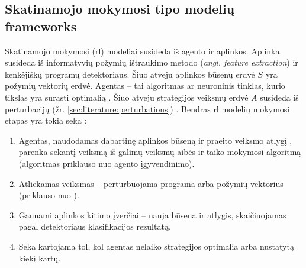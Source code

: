 \subsection{Skatinamojo mokymosi tipo modelių \glspl{framework}}\label{sec:literature:rl}

Skatinamojo mokymosi (\gls{rl}) modeliai susideda iš agento ir aplinkos.
Aplinka susideda iš informatyvių požymių ištraukimo metodo (\textit{angl.
    feature extraction}) ir kenkėjiškų programų detektoriaus. Šiuo atveju aplinkos
būsenų erdvė $S$ yra požymių vektorių erdvė. Agentas -- tai algoritmas ar
neuroninis tinklas, kurio tikslas yra surasti optimalią . Šiuo atveju strategijos veiksmų erdvė $A$ susideda iš
perturbacijų (žr. \ref{sec:literature:perturbations})
\cite{fangEvadingMalwareEngines2019}. Bendras \gls{rl} modelių mokymosi etapas
yra tokia seka \cite{fangEvadingMalwareEngines2019,
    zhongReinforcementLearningBased2022}:
\begin{enumerate}
    \item Agentas, naudodamas dabartinę aplinkos būseną ir praeito veiksmo atlygį
          , parenka sekantį veiksmą iš galimų veiksmų aibės ir taiko
          mokymosi algoritmą (algoritmas priklauso nuo agento įgyvendinimo).
    \item Atliekamas veiksmas -- perturbuojama programa arba požymių vektorius (priklauso
          nuo ).
    \item Gaunami aplinkos kitimo įverčiai -- nauja būsena ir atlygis, skaičiuojamas
          pagal detektoriaus klasifikacijos rezultatą.
    \item Seka kartojama tol, kol agentas nelaiko strategijos optimalia arba nustatytą
          kiekį kartų.
\end{enumerate}

